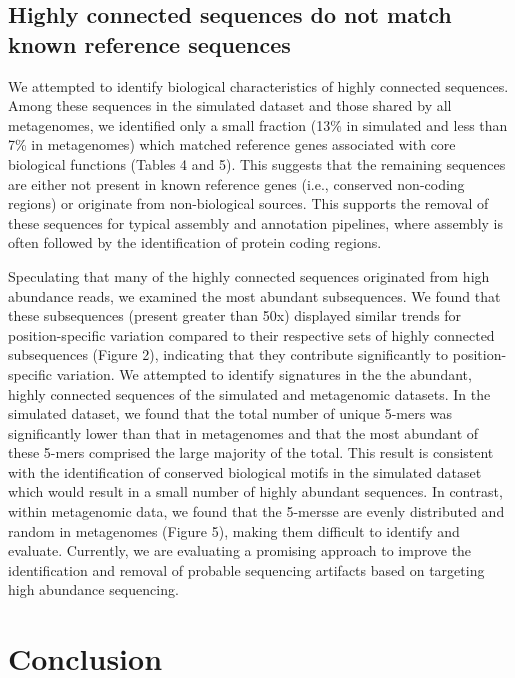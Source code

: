 \documentclass[10pt]{article}
\begin{document}
\subsection*{Highly connected sequences do not match known reference sequences}

We attempted to identify biological characteristics of highly
connected sequences.  Among these sequences in the simulated dataset
and those shared by all metagenomes, we identified only a small
fraction (13\% in simulated and less than 7\% in metagenomes) which
matched reference genes associated with core biological functions
(Tables 4 and 5).  This suggests that the remaining sequences are
either not present in known reference genes (i.e., conserved
non-coding regions) or originate from non-biological sources.  This
supports the removal of these sequences for typical assembly and
annotation pipelines, where assembly is often followed by the
identification of protein coding regions.

Speculating that many of the highly connected sequences originated
from high abundance reads, we examined the most abundant subsequences.  We found
that these subsequences (present greater than 50x) displayed similar
trends for position-specific variation compared to their respective sets
of highly connected subsequences (Figure 2), indicating that they
contribute significantly to position-specific variation.  We attempted to
identify signatures in the the abundant, highly connected sequences of
the simulated and metagenomic datasets.  In the simulated dataset, we
found that the total number of unique 5-mers was significantly lower
than that in metagenomes and that the most abundant of these 5-mers
comprised the large majority of the total.  This result is consistent
with the identification of conserved biological motifs in the
simulated dataset which would result in a small number of highly
abundant sequences.  In contrast, within metagenomic data, we found
that the 5-mersse are evenly distributed and random in metagenomes
(Figure 5), making them difficult to identify and evaluate.
Currently, we are evaluating a promising approach to improve the
identification and removal of probable sequencing artifacts based on
targeting high abundance sequencing.

\section*{Conclusion}
\end{document}
